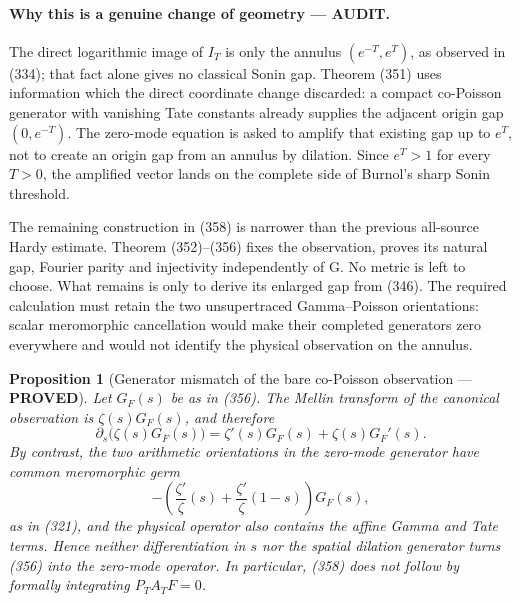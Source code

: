 \documentclass[11pt]{article}
\newtheorem{proposition}[theorem]{Proposition}
\newcommand{\PROVED}{\textcolor{green!45!black}{\textbf{PROVED}}}
\newcommand{\AUDIT}{\textcolor{orange!75!black}{\textbf{AUDIT}}}
\begin{document}
\paragraph{Why this is a genuine change of geometry --- \AUDIT.}
The direct logarithmic image of $I_T$ is only the annulus
$(e^{-T},e^T)$, as observed in (334); that fact alone gives no classical
Sonin gap.  Theorem (351) uses information which the direct coordinate
change discarded: a compact co-Poisson generator with vanishing Tate
constants already supplies the adjacent origin gap $(0,e^{-T})$.  The
zero-mode equation is asked to amplify that existing gap up to $e^T$, not to
create an origin gap from an annulus by dilation.  Since $e^T>1$ for every
$T>0$, the amplified vector lands on the complete side of Burnol's sharp
Sonin threshold.

The remaining construction in (358) is narrower than the previous all-source
Hardy estimate.  Theorem (352)--(356) fixes the observation, proves its
natural gap, Fourier parity and injectivity independently of G.  No metric is
left to choose.  What remains is only to derive its enlarged gap from (346).
The required calculation must retain the two unsupertraced Gamma--Poisson
orientations: scalar meromorphic cancellation would make their completed
generators zero everywhere and would not identify the physical observation
on the annulus.

\begin{proposition}[Generator mismatch of the bare co-Poisson observation ---
\PROVED]
Let $G_F(s)$ be as in (356).  The Mellin transform of the canonical
observation is $\zeta(s)G_F(s)$, and therefore
\begin{equation}
 \partial_s\bigl(\zeta(s)G_F(s)\bigr)
 =\zeta'(s)G_F(s)+\zeta(s)G_F'(s).                  \tag{359}
\end{equation}
By contrast, the two arithmetic orientations in the zero-mode generator
have common meromorphic germ
\begin{equation}
 -\left(
   \frac{\zeta'}{\zeta}(s)
   +\frac{\zeta'}{\zeta}(1-s)
  \right)G_F(s),                                    \tag{360}
\end{equation}
as in (321), and the physical operator also contains the affine Gamma and
Tate terms.  Hence neither differentiation in $s$ nor the spatial dilation
generator turns (356) into the zero-mode operator.  In particular, (358)
does not follow by formally integrating $P_TA_TF=0$.
\end{proposition}
\end{document}
